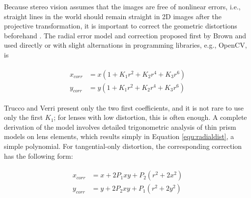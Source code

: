 
Because stereo vision assumes that the images are free of nonlinear errors, i.e., straight lines in the world should remain straight in 2D images after the projective transformation, it is important to correct the geometric distortions beforehand \cite{szeliski10vision}.
The radial error model and correction proposed first by Brown \cite{brown1971close,brown1966decentering} and used directly or with slight alternations in programming libraries, e.g., OpenCV, \cite{opencv} is %

\begin{align} \label{equ:radialdist} \begin{split}
	x_{corr} &= x(1 + K_1 r^2 + K_2 r^4 + K_3 r^6)\\
	y_{corr} &= y(1 + K_1 r^2 + K_2 r^4 + K_3 r^6)
\end{split} \end{align}

Trucco and Verri \cite{trucco1998introductory} present only the two first coefficients, and it is not rare to use only the first $K_1$; for lenses with low distortion, this is often enough.
A complete derivation of the model involves detailed trigonometric analysis of thin prism models on lens elements, which results simply in Equation \ref{equ:radialdist}, a simple polynomial.
For tangential-only distortion, the corresponding correction has the following form:

\begin{align} \label{equ:tangdist} \begin{split}
x_{corr} &= x + 2 P_1 x y + P_2 (r^2 + 2 x^2)\\
y_{corr} &= y + 2 P_2 x y + P_1 (r^2 + 2 y^2)
\end{split} \end{align}

